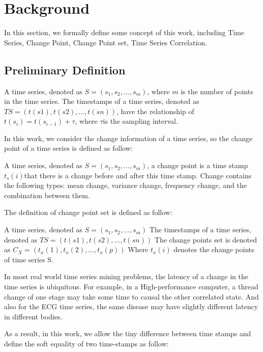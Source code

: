 \section{Background}
\label{sec:formulation}
In this section, we formally define some concept of this work, including Time Series, Change Point, Change Point set, Time Series Correlation.

\subsection{Preliminary Definition}

\begin{definition}
A time series, denoted as $S = (s_1,s_2,...,s_m)$, where $m$ is the number of points in the time series. The timestamps of a time series, denoted as $TS = (t(s1), t(s2),..., t(sn))$, have the relationship of $t(s_i) = t(s_{i-1})+\tau$, where $\tau$is the sampling interval.
\end{definition}

In this work, we consider the change information of a time series, so the change point of a time series is defined as follow:
\begin{definition}
A time series, denoted as $S = (s_1,s_2,...,s_m)$, a change point is a time stamp $t_s(i)$that there is a change before and after this time stamp. Change contains the following types: mean change, variance change,  frequency change, and the combination between them.
\end{definition}

The definition of change point set is defined as follow:
\begin{definition}
A time series, denoted as
$S = (s_1,s_2,...,s_m)$
The timestamps of a time series, denoted as 
$TS = (t(s1), t(s2),..., t(sn))$
The change points set is denoted as 
$C_X=(t_x(1),t_x(2),...,t_x(p))$
Where $t_x(i)$ denotes the change points of time series S.
\end{definition}

In most real world time series mining problems, the latency of a change in the time series is ubiquitous.
For example, in a High-performance computer, a thread change of one stage may take some time to causal the other correlated state. And also for the ECG time series, the same disease may have slightly different latency in different bodies.

As a result, in this work, we allow the tiny difference between time stamps and define the soft equality of two time-stamps as follow:

